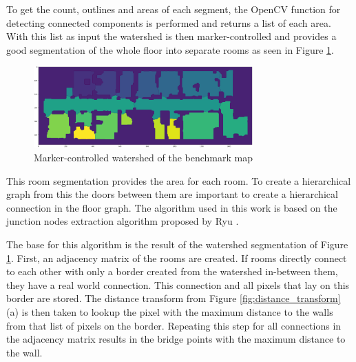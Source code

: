 To get the count, outlines and areas of each segment, the OpenCV function for detecting connected components is performed and returns a list of each area. With this list as input the watershed is then marker-controlled and provides a good segmentation of the whole floor into separate rooms as seen in Figure \ref{fig:watershed}.

\begin{figure}[h]
    \centering
    \includegraphics[width=0.75\textwidth]{figures/50_implementation/ryu_watershed.png}
    \caption[Marker-controlled watershed of the benchmark map]{Marker-controlled watershed of the benchmark map}
    \label{fig:watershed}
\end{figure}

This room segmentation provides the area for each room. To create a hierarchical graph from this the doors between them are important to create a hierarchical connection in the floor graph. The algorithm used in this work is based on the junction nodes extraction algorithm proposed by Ryu \cite{ryu_hierarchical_2020}. 

The base for this algorithm is the result of the watershed segmentation of Figure \ref{fig:watershed}. First, an adjacency matrix of the rooms are created. If rooms directly connect to each other with only a border created from the watershed in-between them, they have a real world connection. This connection and all pixels that lay on this border are stored. The distance transform from Figure \ref{fig:distance_transform} (a) is then taken to lookup the pixel with the maximum distance to the walls from that list of pixels on the border. Repeating this step for all connections in the adjacency matrix results in the bridge points with the maximum distance to the wall. 

